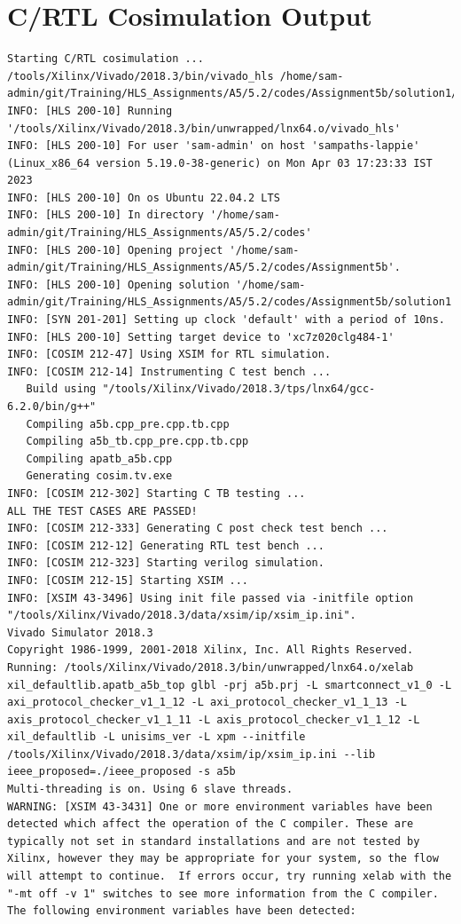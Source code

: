 \documentclass{article}
\begin{document}
\section{C/RTL Cosimulation Output}
\begin{lstlisting}
Starting C/RTL cosimulation ...
/tools/Xilinx/Vivado/2018.3/bin/vivado_hls /home/sam-admin/git/Training/HLS_Assignments/A5/5.2/codes/Assignment5b/solution1/cosim.tcl
INFO: [HLS 200-10] Running '/tools/Xilinx/Vivado/2018.3/bin/unwrapped/lnx64.o/vivado_hls'
INFO: [HLS 200-10] For user 'sam-admin' on host 'sampaths-lappie' (Linux_x86_64 version 5.19.0-38-generic) on Mon Apr 03 17:23:33 IST 2023
INFO: [HLS 200-10] On os Ubuntu 22.04.2 LTS
INFO: [HLS 200-10] In directory '/home/sam-admin/git/Training/HLS_Assignments/A5/5.2/codes'
INFO: [HLS 200-10] Opening project '/home/sam-admin/git/Training/HLS_Assignments/A5/5.2/codes/Assignment5b'.
INFO: [HLS 200-10] Opening solution '/home/sam-admin/git/Training/HLS_Assignments/A5/5.2/codes/Assignment5b/solution1'.
INFO: [SYN 201-201] Setting up clock 'default' with a period of 10ns.
INFO: [HLS 200-10] Setting target device to 'xc7z020clg484-1'
INFO: [COSIM 212-47] Using XSIM for RTL simulation.
INFO: [COSIM 212-14] Instrumenting C test bench ...
   Build using "/tools/Xilinx/Vivado/2018.3/tps/lnx64/gcc-6.2.0/bin/g++"
   Compiling a5b.cpp_pre.cpp.tb.cpp
   Compiling a5b_tb.cpp_pre.cpp.tb.cpp
   Compiling apatb_a5b.cpp
   Generating cosim.tv.exe
INFO: [COSIM 212-302] Starting C TB testing ... 
ALL THE TEST CASES ARE PASSED!
INFO: [COSIM 212-333] Generating C post check test bench ...
INFO: [COSIM 212-12] Generating RTL test bench ...
INFO: [COSIM 212-323] Starting verilog simulation. 
INFO: [COSIM 212-15] Starting XSIM ...
INFO: [XSIM 43-3496] Using init file passed via -initfile option "/tools/Xilinx/Vivado/2018.3/data/xsim/ip/xsim_ip.ini".
Vivado Simulator 2018.3
Copyright 1986-1999, 2001-2018 Xilinx, Inc. All Rights Reserved.
Running: /tools/Xilinx/Vivado/2018.3/bin/unwrapped/lnx64.o/xelab xil_defaultlib.apatb_a5b_top glbl -prj a5b.prj -L smartconnect_v1_0 -L axi_protocol_checker_v1_1_12 -L axi_protocol_checker_v1_1_13 -L axis_protocol_checker_v1_1_11 -L axis_protocol_checker_v1_1_12 -L xil_defaultlib -L unisims_ver -L xpm --initfile /tools/Xilinx/Vivado/2018.3/data/xsim/ip/xsim_ip.ini --lib ieee_proposed=./ieee_proposed -s a5b 
Multi-threading is on. Using 6 slave threads.
WARNING: [XSIM 43-3431] One or more environment variables have been detected which affect the operation of the C compiler. These are typically not set in standard installations and are not tested by Xilinx, however they may be appropriate for your system, so the flow will attempt to continue.  If errors occur, try running xelab with the "-mt off -v 1" switches to see more information from the C compiler. The following environment variables have been detected:

\end{lstlisting}
\end{document}
